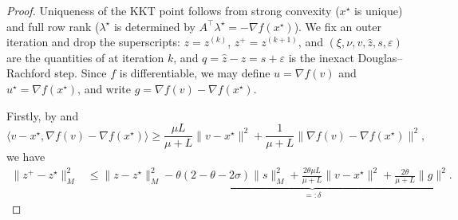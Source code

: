 \documentclass[11pt]{article}
\begin{document}
\begin{proof}
    Uniqueness of the KKT point follows from strong convexity ($x^\star$ is unique) and full row rank ($\lambda^\star$ is determined by $A^\top\lambda^\star = -\nabla f(x^\star)$).
    We fix an outer iteration and drop the superscripts: $z = z^{(k)}$, $z^+ = z^{(k+1)}$, and $(\xi, \nu, v, \hat z, s, \varepsilon)$ are the quantities of  at iteration $k$, and $q = \hat z - z = s + \varepsilon$ is the inexact Douglas--Rachford step.
    Since $f$ is differentiable, we may define $u = \nabla f(v)$ and $u^\star = \nabla f(x^\star)$, and write $g = \nabla f(v) - \nabla f(x^\star)$.

    Firstly, by  and \cite[Theorem 2.1.12]{nesterov2004introductory}
    \begin{equation}\label{eq:l-smooth-mu-strongly-convex-inequality}
        \langle v - x^\star, \nabla f(v) - \nabla f(x^\star)\rangle \geq \frac{\mu L}{\mu + L} \|v - x^\star\|^2 + \frac{1}{\mu+L}\|\nabla f(v) - \nabla f(x^\star)\|^2,
    \end{equation}
    we have
    \begin{align}\label{eq:decrease-delta}
        \|z^+ - z^\star\|_M^2 &\leq \|z - z^\star\|_M^2 - \underbrace{\theta(2-\theta-2\sigma)\|s\|_M^2 + \frac{2\theta\mu L}{\mu + L}\|v - x^\star\|^2 + \frac{2\theta}{\mu + L}\|g\|^2}_{=:\delta}.
    \end{align}


\end{proof}
\end{document}
